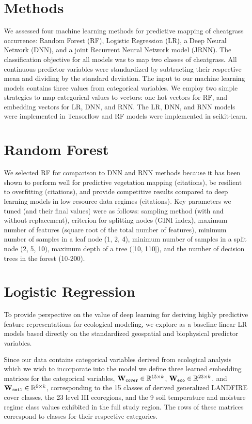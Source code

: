 \documentclass{article} %
\begin{document}
\section{Methods}
We assessed four machine learning methods for predictive mapping of cheatgrass occurrence: Random Forest (RF), Logistic Regression (LR), a Deep Neural Network (DNN), and a joint Recurrent Neural Network model (JRNN). The classification objective for all models was to map two classes of cheatgrass. All continuous predictor variables were standardized by subtracting their respective mean and dividing by the standard deviation. The input to our machine learning models contains three values from categorical variables. We employ two simple strategies to map categorical values to vectors: one-hot vectors for RF, and embedding vectors for LR, DNN, and RNN. The LR, DNN, and RNN models were implemented in Tensorflow and RF models were implemented in scikit-learn.

\section{Random Forest}
We selected RF for comparison to DNN and RNN methods because it has been shown to perform well for predictive vegetation mapping (citations), be resilient to overfitting (citations), and provide competitive results compared to deep learning models in low resource data regimes (citations). 
Key parameters we tuned (and their final values) were as follows: sampling method (with and without replacement), criterion for splitting nodes (GINI index), maximum number of features (square root of the total number of features), minimum number of samples in a leaf node ({1, 2, 4}), minimum number of samples in a split node ({2, 5, 10}), maximum depth of a tree ([10, 110]), and the number of decision trees in the forest (10-200).

\section{Logistic Regression}
To provide perspective on the value of deep learning for deriving highly predictive feature representations for ecological modeling, we explore as a baseline linear LR models based directly on the standardized geospatial and biophysical predictor variables.


Since our data contains categorical variables derived from ecological analysis which we wish to incorporate into the model we define three learned embedding matrices for the categorical variables, ${\bf W}_{\texttt{cover}}\in \mathbb{R}^{15 \times k}$, ${\bf W}_{\texttt{eco}}\in \mathbb{R}^{23 \times k}$, and ${\bf W}_{\texttt{soil}}\in \mathbb{R}^{9 \times k}$, corresponding to the 15 classes of derived generalized LANDFIRE cover classes, the 23 level III ecoregions, and the 9 soil temperature and moisture regime class values exhibited in the full study region. The rows of these matrices correspond to classes for their respective categories. 
\end{document}
